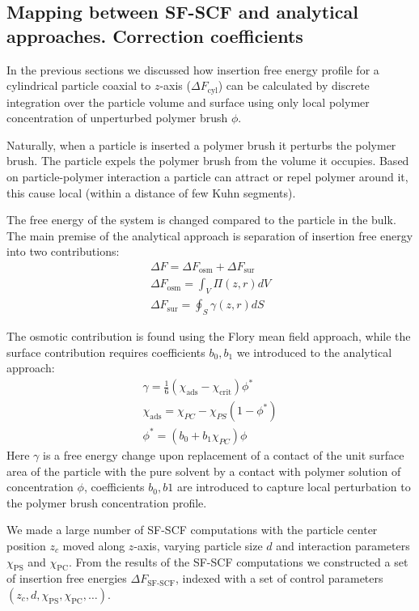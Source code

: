 \documentclass[10pt, a4paper]{article}
\begin{document}
\subsection*{Mapping between SF-SCF and analytical approaches. Correction coefficients}
\begin{multicols}{2}

In the previous sections we discussed how insertion free energy profile for a cylindrical particle coaxial to $z$-axis ($\Delta F_{\textrm{cyl}}$) can be calculated by discrete integration over the particle volume and surface using only local polymer concentration of unperturbed polymer brush $\phi$.

Naturally, when a particle is inserted a polymer brush it perturbs the polymer brush.
The particle expels the polymer brush from the volume it occupies.
Based on particle-polymer interaction a particle can attract or repel polymer around it, this cause local (within a distance of few Kuhn segments).

The free energy of the system is changed compared to the particle in the bulk.
The main premise of the analytical approach is separation of insertion free energy into two contributions:
\begin{eqnarray}
    \Delta F = \Delta F_{\textrm{osm}} + \Delta F_{\textrm{sur}}
    \\
    \Delta F_{\textrm{osm}} = \int_{V} \Pi(z,r) dV
    \\
    \Delta F_{\textrm{sur}} = \oint_{S} \gamma (z,r) dS
\label{Delta_F}
\end{eqnarray}


The osmotic contribution is found using the Flory mean field approach, while the surface contribution requires coefficients $b_0, b_1$ we introduced to the analytical approach:
\begin{eqnarray}
    \gamma = \frac{1}{6}(\chi_{\textrm{ads}} - \chi_{\textrm{crit}})\phi^{\ast}
    \\
    \chi_{\textrm{ads}} = \chi_{PC} - \chi_{PS}(1-\phi^{\ast})
    \\
    \phi^{\ast}= (b_{0} + b_{1}\chi_{PC})\phi \label{eq:phi_correction}
\end{eqnarray}
Here $\gamma$ is a free energy change upon replacement of a contact of the unit surface area of the particle with the pure solvent by a contact with polymer solution of concentration $\phi$, coefficients $b_0, b1$ are introduced to capture local perturbation to the polymer brush concentration profile.

We made a large number of SF-SCF computations with the particle center position $z_{c}$ moved along $z$-axis, varying particle size $d$ and interaction parameters $\chi_{\textrm{PS}}$ and $\chi_{\textrm{PC}}$. 
From the results of the SF-SCF computations we constructed a set of insertion free energies $\Delta F_{\textrm{SF-SCF}}$, indexed with a set of control parameters $(z_c, d, \chi_{\textrm{PS}}, \chi_{\textrm{PC}}, \dots)$.


\end{multicols}
\end{document}
